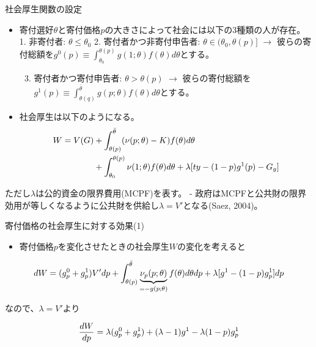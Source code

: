 \documentclass[
  ignorenonframetext,
  aspectratio=169,
]{beamer}
\providecommand{\tightlist}{%
  \setlength{\itemsep}{0pt}\setlength{\parskip}{0pt}}
\begin{document}
\begin{frame}{社会厚生関数の設定}
\protect\hypertarget{ux793eux4f1aux539aux751fux95a2ux6570ux306eux8a2dux5b9a}{}
\begin{itemize}
\tightlist
\item
  寄付選好\(\theta\)と寄付価格\(p\)の大きさによって社会には以下の3種類の人が存在。
  1. 非寄付者: \(\theta\le \theta_0\)
  2. 寄付者かつ非寄付申告者: \(\theta\in(\theta_0,\theta(p)]\) \(\to\) 彼らの寄付総額を\(g^0(p)\equiv\int_{\theta_0}^{\theta(p)}g(1;\theta)f(\theta)d\theta\)とする。

  \begin{enumerate}
  \setcounter{enumi}{2}
  \tightlist
  \item
    寄付者かつ寄付申告者: \(\theta>\theta(p)\) \(\to\) 彼らの寄付総額を\(g^1(p)\equiv\int_{\theta(q)}^{\bar{\theta}}g(p;\theta)f(\theta)d\theta\)とする。
  \end{enumerate}
\item
  社会厚生は以下のようになる。
  \begin{align}
  W=V(G)&+\int_{\theta(p)}^{\bar{\theta}}(\nu(p;\theta)-K)f(\theta)d\theta\notag\\
  &+\int_{\theta_0}^{\theta(p)}\nu(1;\theta)f(\theta)d\theta+\lambda[ty-(1-p)g^1(p)-G_g]\notag
  \end{align}
\end{itemize}

ただし\(\lambda\)は公的資金の限界費用(MCPF)を表す。
- 政府はMCPFと公共財の限界効用が等しくなるように公共財を供給し\(\lambda=V'\)となる(Saez, 2004)。
\end{frame}

\begin{frame}{寄付価格の社会厚生に対する効果(1)}
\protect\hypertarget{ux5bc4ux4ed8ux4fa1ux683cux306eux793eux4f1aux539aux751fux306bux5bfeux3059ux308bux52b9ux679c1}{}
\begin{itemize}
\tightlist
\item
  寄付価格\(p\)を変化させたときの社会厚生\(W\)の変化を考えると
\end{itemize}

\begin{align}
  dW 
  =(g_p^0+g_p^1)V'dp+\int_{\theta(p)}^{\bar{\theta}}\underbrace{\nu_p(p;\theta)}_{=-g(p;\theta)}f(\theta)d\theta dp+\lambda[g^1-(1-p)g^1_p]dp\notag
\end{align}

なので、\(\lambda=V'\)より

\begin{align}
  \frac{dW}{dp} =\lambda (g_p^0+g_p^1)+(\lambda-1)g^1-\lambda(1-p)g_p^1\notag
\end{align}
\end{frame}
\end{document}
